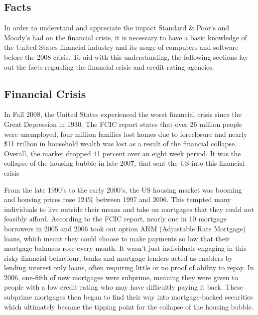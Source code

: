 \documentclass[11pt]{article}
\begin{document}
\newpage



\begin{multicols}{2}
\setcounter{page}{1}
\section{Facts}
In order to understand and appreciate the impact Standard \& Poor's and Moody's had on the financial crisis, it is necessary to have a basic knowledge of the United States financial industry and its usage of computers and software before the 2008 crisis.  To aid with this understanding, the following sections lay out the facts regarding the financial crisis and credit rating agencies.


\subsection{Financial Crisis}
In Fall 2008, the United States experienced the worst financial crisis since the Great Depression in 1930.  The FCIC report states that over 26 million people were unemployed, four million families lost homes due to foreclosure and nearly \$11 trillion in household wealth was lost as a result of the financial collapse.  \cite[p.~xv]{govtReport}  Overall, the market dropped 41 percent over an eight week period. \cite{marketWatch}  It was the collapse of the housing bubble in late 2007, that sent the US into this financial crisis


From the late 1990's to the early 2000's, the US housing market was booming and housing prices rose 124\% between 1997 and 2006. \cite{economistCreditCrunch}  This tempted many individuals to live outside their means and take on mortgages that they could not feasibly afford.  According to the FCIC report, nearly one in 10 mortgage borrowers in 2005 and 2006 took out option ARM (Adjustable Rate Mortgage) loans, which meant they could choose to make payments so low that their mortgage balances rose every month. \cite[p.~xx]{govtReport} It wasn't just individuals engaging in this risky financial behaviour, banks and mortgage lenders acted as enablers by lending interest only loans, often requiring little or no proof of ability to repay. \cite[p.~xxiii]{govtReport}  In 2006, one-fifth of new mortgages were subprime, meaning they were given to people with a low credit rating who may have difficultly paying it back. \cite{economistCreditCrunch}  These subprime mortgages then began to find their way into mortgage-backed securities which ultimately became the tipping point for the collapse of the housing bubble.



\end{multicols}
\end{document}
